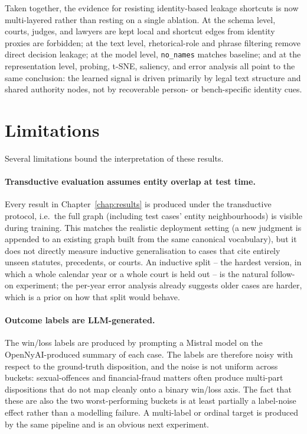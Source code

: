 {\color{blue}Taken together, the evidence for resisting identity-based
leakage shortcuts is now multi-layered rather than resting on a single
ablation. At the schema level, courts, judges, and lawyers are kept
local and shortcut edges from identity proxies are forbidden; at the
text level, rhetorical-role and phrase filtering remove direct decision
leakage; at the model level, \texttt{no\_names} matches baseline; and
at the representation level, probing, t-SNE, saliency, and error
analysis all point to the same conclusion: the learned signal is driven
primarily by legal text structure and shared authority nodes, not by
recoverable person- or bench-specific identity cues.\par}

\section{Limitations}

Several limitations bound the interpretation of these results.

\paragraph{Transductive evaluation assumes entity overlap at test
time.} Every result in Chapter~\ref{chap:results} is produced under
the transductive protocol, i.e.\ the full graph (including test
cases' entity neighbourhoods) is visible during training. This
matches the realistic deployment setting (a new judgment is appended
to an existing graph built from the same canonical vocabulary), but
it does not directly measure inductive generalisation to cases that
cite entirely unseen statutes, precedents, or courts. An inductive
split -- the hardest version, in which a whole calendar year or a
whole court is held out -- is the natural follow-on experiment; the
per-year error analysis already suggests older cases are harder,
which is a prior on how that split would behave.

\paragraph{Outcome labels are LLM-generated.} The win/loss labels are
produced by prompting a Mistral model on the OpenNyAI-produced summary
of each case. The labels are therefore noisy with respect to the
ground-truth disposition, and the noise is not uniform across
buckets: sexual-offences and financial-fraud matters often produce
multi-part dispositions that do not map cleanly onto a binary
win/loss axis. The fact that these are also the two worst-performing
buckets is at least partially a label-noise effect rather than a
modelling failure. A multi-label or ordinal target is produced by the
same pipeline and is an obvious next experiment.

